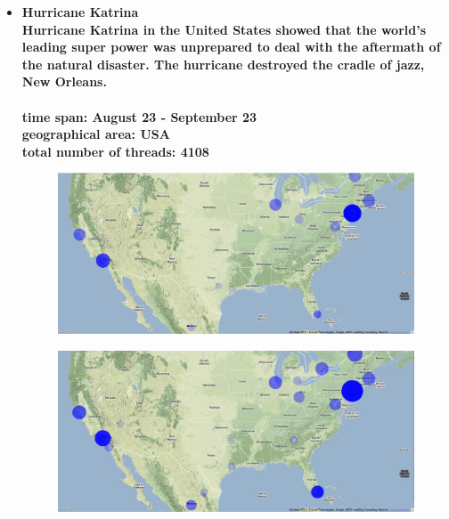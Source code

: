 \documentclass[11pt,a4paper,english]{article}
\begin{document}
\begin{itemize}
						
				\item \bf Hurricane Katrina \rm
					\\ Hurricane Katrina in the United States showed that the world's leading super power was unprepared to deal with the aftermath of the natural disaster. The hurricane destroyed the cradle of jazz, New Orleans. 
					\\\\ \bf time span: \rm August 23 - September 23
					\\ \bf geographical area: \rm USA
					\\ \bf total number of threads: \rm 4108
					\begin{figure}[H]
						\vspace{-10pt}
  							\begin{center}
								\includegraphics[width=130mm]{img/pre-katrina}
							\end{center}
							\vspace{-13pt}
					\end{figure}
					\begin{figure}[H]
						\vspace{-10pt}
						\begin{center}
							\includegraphics[width=130mm]{img/post-katrina}
						\end{center}					
						\vspace{-13pt}
					\end{figure}
					

\end{itemize}
\end{document}
